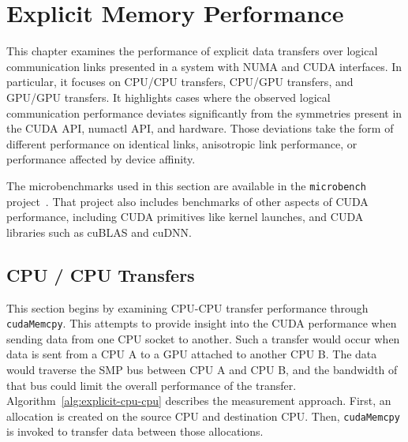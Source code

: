 \chapter{Explicit Memory Performance}
\label{ch:explicit}

This chapter examines the performance of explicit data transfers over logical communication links presented in a system with NUMA and CUDA interfaces.
In particular, it focuses on CPU/CPU transfers, CPU/GPU transfers, and GPU/GPU transfers.
It highlights cases where the observed logical communication performance deviates significantly from the symmetries present in the CUDA API, numactl API, and hardware.
Those deviations take the form of different performance on identical links, anisotropic link performance, or performance affected by device affinity.

The microbenchmarks used in this section are available in the \texttt{microbench} project~\cite{pearson2018microbench}.
That project also includes benchmarks of other aspects of CUDA performance, including CUDA primitives like kernel launches, and CUDA libraries such as cuBLAS and cuDNN.

\section{CPU / CPU Transfers}
\label{sec:explicit-cpu-cpu}

This section begins by examining CPU-CPU transfer performance through \texttt{cudaMemcpy}.
This attempts to provide insight into the CUDA performance when sending data from one CPU socket to another.
Such a transfer would occur when data is sent from a CPU A to a GPU attached to another CPU B.
The data would traverse the SMP bus between CPU A and CPU B, and the bandwidth of that bus could limit the overall performance of the transfer.
Algorithm~\ref{alg:explicit-cpu-cpu} describes the measurement approach.
First, an allocation is created on the source CPU and destination CPU.
Then, \texttt{cudaMemcpy} is invoked to transfer data between those allocations.

